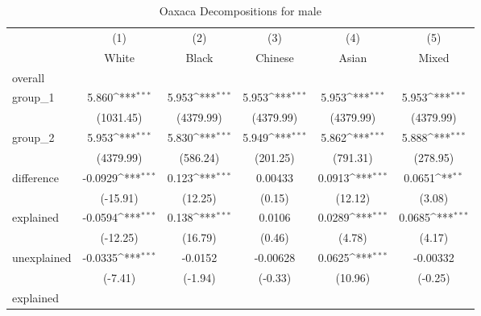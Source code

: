 \begin{table}[htbp]\centering
\def\sym#1{\ifmmode^{#1}\else\(^{#1}\)\fi}
\caption{Oaxaca Decompositions for male\label{tab1}}
\begin{tabular}{l*{5}{c}}
\hline\hline
            &\multicolumn{1}{c}{(1)}&\multicolumn{1}{c}{(2)}&\multicolumn{1}{c}{(3)}&\multicolumn{1}{c}{(4)}&\multicolumn{1}{c}{(5)}\\
            &\multicolumn{1}{c}{White}&\multicolumn{1}{c}{Black}&\multicolumn{1}{c}{Chinese}&\multicolumn{1}{c}{Asian}&\multicolumn{1}{c}{Mixed}\\
\hline
overall     &                     &                     &                     &                     &                     \\
group\_1     &       5.860\sym{***}&       5.953\sym{***}&       5.953\sym{***}&       5.953\sym{***}&       5.953\sym{***}\\
            &   (1031.45)         &   (4379.99)         &   (4379.99)         &   (4379.99)         &   (4379.99)         \\
group\_2     &       5.953\sym{***}&       5.830\sym{***}&       5.949\sym{***}&       5.862\sym{***}&       5.888\sym{***}\\
            &   (4379.99)         &    (586.24)         &    (201.25)         &    (791.31)         &    (278.95)         \\
difference  &     -0.0929\sym{***}&       0.123\sym{***}&     0.00433         &      0.0913\sym{***}&      0.0651\sym{**} \\
            &    (-15.91)         &     (12.25)         &      (0.15)         &     (12.12)         &      (3.08)         \\
explained   &     -0.0594\sym{***}&       0.138\sym{***}&      0.0106         &      0.0289\sym{***}&      0.0685\sym{***}\\
            &    (-12.25)         &     (16.79)         &      (0.46)         &      (4.78)         &      (4.17)         \\
unexplained &     -0.0335\sym{***}&     -0.0152         &    -0.00628         &      0.0625\sym{***}&    -0.00332         \\
            &     (-7.41)         &     (-1.94)         &     (-0.33)         &     (10.96)         &     (-0.25)         \\
\hline
explained   &                     &                     &                     &                     &                     \\

\end{tabular}
\end{table}
